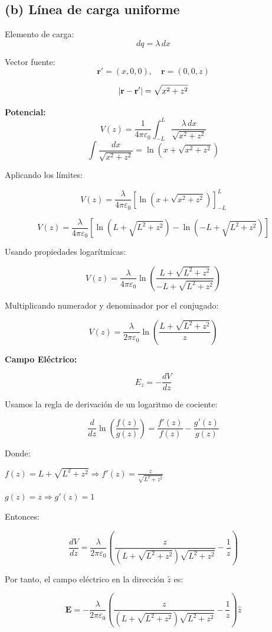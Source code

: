 \documentclass[12pt,letterpaper]{article}
\begin{document}
\subsection*{(b) Línea de carga uniforme}

Elemento de carga:
\[
dq = \lambda \, dx
\]

Vector fuente:
\[
\mathbf{r}' = (x, 0, 0), \quad \mathbf{r} = (0, 0, z)
\]

\[
\abs{\mathbf{r} - \mathbf{r}'} = \sqrt{x^2 + z^2}
\]

\textbf{Potencial:}
\[
V(z) = \frac{1}{4\pi\varepsilon_0} \int_{-L}^{L} \frac{\lambda \, dx}{\sqrt{x^2 + z^2}} 
\]
\[
\int \frac{dx}{\sqrt{x^2 + z^2}} = \ln\left(x + \sqrt{x^2 + z^2} \right)
\]

Aplicando los límites:

\[
V(z) = \frac{\lambda}{4\pi \varepsilon_0} \left[ \ln\left(x + \sqrt{x^2 + z^2}\right) \right]_{-L}^{L}
\]

\[
V(z) = \frac{\lambda}{4\pi \varepsilon_0} \left[ \ln\left(L + \sqrt{L^2 + z^2} \right) - \ln\left(-L + \sqrt{L^2 + z^2} \right) \right]
\]

Usando propiedades logarítmicas:

\[
V(z) = \frac{\lambda}{4\pi \varepsilon_0} \ln\left( \frac{L + \sqrt{L^2 + z^2}}{-L + \sqrt{L^2 + z^2}} \right)
\]

Multiplicando numerador y denominador por el conjugado:

\[
V(z) = \frac{\lambda}{2\pi \varepsilon_0} \ln\left( \frac{L + \sqrt{L^2 + z^2}}{z} \right)
\]

\textbf{Campo Eléctrico:}

\[
E_z = -\frac{dV}{dz}
\]


Usamos la regla de derivación de un logaritmo de cociente:

\[
\frac{d}{dz} \ln\left( \frac{f(z)}{g(z)} \right) = \frac{f'(z)}{f(z)} - \frac{g'(z)}{g(z)}
\]

Donde:

\(f(z) = L + \sqrt{L^2 + z^2} \Rightarrow f'(z) = \frac{z}{\sqrt{L^2 + z^2}}\)

\(g(z) = z \Rightarrow g'(z) = 1\)

Entonces:

\[
\frac{dV}{dz} = \frac{\lambda}{2\pi \varepsilon_0} \left( \frac{z}{(L + \sqrt{L^2 + z^2}) \sqrt{L^2 + z^2}} - \frac{1}{z} \right)
\]

Por tanto, el campo eléctrico en la dirección \(\hat{z}\) es:

\[
\mathbf{E} = - \frac{\lambda}{2\pi \varepsilon_0} \left( \frac{z}{(L + \sqrt{L^2 + z^2}) \sqrt{L^2 + z^2}} - \frac{1}{z} \right) \hat{z}
\]
\end{document}
